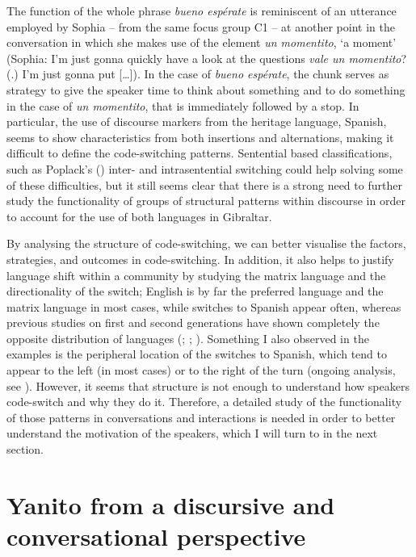 \documentclass[output=paper]{langscibook}
\begin{document}
The function of the whole phrase \textit{bueno espérate} is reminiscent of an utterance employed by Sophia – from the same focus group C1 – at another point in the conversation in which she makes use of the element \textit{un momentito}, ‘a moment’ (Sophia: I’m just gonna quickly have a look at the questions \textit{vale un momentito}? (.) I’m just gonna put […]). In the case of \textit{bueno espérate}, the chunk serves as strategy to give the speaker time to think about something and to do something in the case of \textit{un momentito}, that is immediately followed by a stop. In particular, the use of discourse markers from the heritage language, Spanish, seems to show characteristics from both insertions and alternations, making it difficult to define the code-switching patterns. Sentential based classifications, such as Poplack’s (\citeyear{poplack_sometimes_1980}) inter- and intrasentential switching could help solving some of these difficulties, but it still seems clear that there is a strong need to further study the functionality of groups of structural patterns within discourse in order to account for the use of both languages in Gibraltar. 

By analysing the structure of code-switching, we can better visualise the factors, strategies, and outcomes in code-switching. In addition, it also helps to justify language shift within a community by studying the matrix language and the directionality of the switch; English is by far the preferred language and the matrix language in most cases, while switches to Spanish appear often, whereas previous studies on first and second generations have shown completely the opposite distribution of languages (\citealt{moyer_analysis_1993}; \citealt{kellermann_new_2001}; \citealt{weston_code-switching_2013}). Something I also observed in the examples is the peripheral location of the switches to Spanish, which tend to appear to the left (in most cases) or to the right of the turn (ongoing analysis, see \cite{goria_complex_2021}). However, it seems that structure is not enough to understand how speakers code-switch and why they do it. Therefore, a detailed study of the functionality of those patterns in conversations and interactions is needed in order to better understand the motivation of the speakers, which I will turn to in the next section.

\section{Yanito from a discursive and conversational perspective}\label{RG:sec:05}
\end{document}

